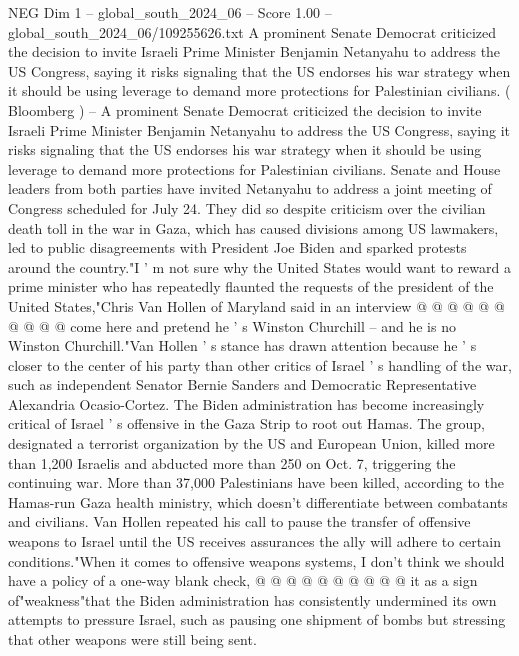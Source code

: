 \begin{textsample}{NEG Dim 1 – global\_south\_2024\_06 – Score 1.00 – global\_south\_2024\_06/109255626.txt}  \label{ex:f1_neg_326}
A prominent Senate Democrat criticized the decision to invite Israeli Prime Minister Benjamin Netanyahu to address the US Congress, saying it risks signaling that the US endorses his war strategy when it should be using leverage to demand more protections for Palestinian civilians. ( Bloomberg ) -- A prominent Senate Democrat criticized the decision to invite Israeli Prime Minister Benjamin Netanyahu to address the US Congress, saying it risks signaling that the US endorses his war strategy when it should be using leverage to demand more protections for Palestinian civilians.
Senate and House leaders from both parties have invited Netanyahu to address a joint meeting of Congress scheduled for July 24.
They did so despite criticism over the civilian death toll in the war in Gaza, which has caused divisions among US lawmakers, led to public disagreements with President Joe Biden and sparked protests around the country."I ' m not sure why the United States would want to reward a prime minister who has repeatedly flaunted the requests of the president of the United States,"Chris Van Hollen of Maryland said in an interview @ @ @ @ @ @ @ @ @ @ come here and pretend he ' s Winston Churchill -- and he is no Winston Churchill."Van Hollen ' s stance has drawn attention because he ' s closer to the center of his party than other critics of Israel ' s handling of the war, such as independent Senator Bernie Sanders and Democratic Representative Alexandria Ocasio-Cortez.
The Biden administration has become increasingly critical of Israel ' s offensive in the Gaza Strip to root out Hamas.
The group, designated a terrorist organization by the US and European Union, killed more than 1,200 Israelis and abducted more than 250 on Oct. 7, triggering the continuing war.
More than 37,000 Palestinians have been killed, according to the Hamas-run Gaza health ministry, which doesn't differentiate between combatants and civilians.
Van Hollen repeated his call to pause the transfer of offensive weapons to Israel until the US receives assurances the ally will adhere to certain conditions."When it comes to offensive weapons systems, I don't think we should have a policy of a one-way blank check, @ @ @ @ @ @ @ @ @ @ it as a sign of"weakness"that the Biden administration has consistently undermined its own attempts to pressure Israel, such as pausing one shipment of bombs but stressing that other weapons were still being sent.

\end{textsample}
